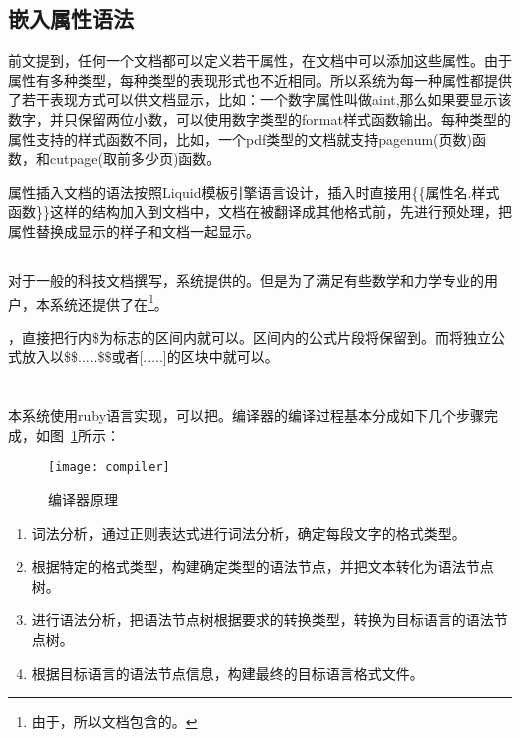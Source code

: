 \subsection{嵌入属性语法}
\label{sec:addattr}

前文提到，任何一个文档都可以定义若干属性，在文档中可以添加这些属性。由于属性有多种类型，每种类型的表现形式也不近相同。所以系统为每一种属性都提供了若干表现方式可以供文档显示，比如：一个数字属性叫做aint,那么如果要显示该数字，并只保留两位小数，可以使用数字类型的format样式函数输出。每种类型的属性支持的样式函数不同，比如，一个pdf类型的文档就支持pagenum(页数)函数，和cutpage(取前多少页)函数。

属性插入文档的语法按照Liquid模板引擎语言设计，插入时直接用\{\{属性名.样式函数\}\}这样的结构加入到文档中，文档在被翻译成其他格式前，先进行预处理，把属性替换成显示的样子和文档一起显示。

\subsection{}
\label{sec:latexpic}

对于一般的科技文档撰写，系统提供的。但是为了满足有些数学和力学专业的用户，本系统还提供了在\footnote{由于，所以文档包含的。}。

，直接把行内\$为标志的区间内就可以。区间内的公式片段将保留到。而将独立公式放入以\$\$.....\$\$或者[.....]的区块中就可以。

\section{}
\label{sec:compiler}

本系统使用ruby语言实现，可以把。编译器的编译过程基本分成如下几个步骤完成，如图~\ref{fig:xfig14}所示：
\begin{figure}[H]
  \centering
  \texttt{[image: compiler]}
  \caption{编译器原理}
  \label{fig:xfig14}
\end{figure}

\begin{enumerate}
\item 词法分析，通过正则表达式进行词法分析，确定每段文字的格式类型。
\item 根据特定的格式类型，构建确定类型的语法节点，并把文本转化为语法节点树。
\item 进行语法分析，把语法节点树根据要求的转换类型，转换为目标语言的语法节点树。
\item 根据目标语言的语法节点信息，构建最终的目标语言格式文件。
\end{enumerate}


